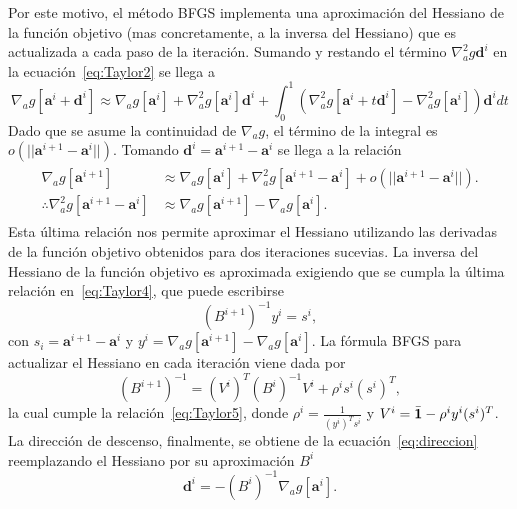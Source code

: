Por este motivo, el método BFGS implementa una aproximación del Hessiano de la función objetivo (mas concretamente, 
a la inversa del Hessiano) que 
es actualizada a cada paso de la iteración. Sumando y restando el término $ \nabla_a^2 g \mathbf{d}^i$ en la ecuación~\eqref{eq:Taylor2} se llega a
\begin{equation}
\nabla_a g[\mathbf{a}^i+ \mathbf{d}^i]\approx \nabla_a g[\mathbf{a}^i]+ \nabla_a^2 g[\mathbf{a}^i]\mathbf{d}^i + \int_0^1   \left( \nabla_a^2 g[\mathbf{a}^i+t\mathbf{d}^i]-\nabla_a^2 g[\mathbf{a}^i] \right)\mathbf{d}^idt
\label{eq:Taylor3}
\end{equation}
Dado que se asume la continuidad de $\nabla_a g$, el término de la integral 
es $o(||\mathbf{a}^{i+1}-\mathbf{a}^{i}||)$. Tomando $\mathbf{d}^i=\mathbf{a}^{i+1}-\mathbf{a}^{i}$ se llega a la relación
\begin{equation}
\begin{split}
\begin{aligned}
\nabla_a g[\mathbf{a}^{i+1}] &\approx \nabla_a g[\mathbf{a}^i]+ \nabla_a^2 g[\mathbf{a}^{i+1}-\mathbf{a}^i]  + o(||\mathbf{a}^{i+1}-\mathbf{a}^{i}||).\\
\therefore \nabla_a^2 g[\mathbf{a}^{i+1}-\mathbf{a}^i]& \approx \nabla_a g[\mathbf{a}^{i+1}]  - \nabla_a g[\mathbf{a}^{i}].
\end{aligned}
\end{split}
\label{eq:Taylor4}
\end{equation}
Esta última relación nos permite aproximar el Hessiano utilizando las derivadas de 
la función objetivo obtenidos para dos iteraciones sucevias. 
La inversa del Hessiano de la función objetivo es aproximada exigiendo que se cumpla la última relación en~\eqref{eq:Taylor4}, que puede escribirse 
\begin{equation}
(B^{i+1})^{-1}y^i=s^i,
\label{eq:Taylor5}
\end{equation}
con $s_i=  \mathbf{a}^{i+1}-\mathbf{a}^{i}$ y $y^i=\nabla_a g[\mathbf{a}^{i+1}]  - \nabla_a g[\mathbf{a}^{i}]$. La fórmula BFGS para actualizar el Hessiano en cada iteración viene dada por~\cite{Nocedal2006}
\begin{equation}
(B^{i+1})^{-1}=(V^i)^T (B^{i})^{-1}V^i + \rho^i s^i (s^i)^T  ,
\label{eq:HBFGS}
\end{equation}
la cual cumple la relación~\eqref{eq:Taylor5}, donde $\rho^i=\frac{1}{(y^i)^T s^i}$ 
y $V^i=\bar{\mathbf{1}} - \rho^i y^i (s^i)^T$. 
La dirección de descenso, finalmente, se obtiene de la ecuación~\eqref{eq:direccion} reemplazando 
el Hessiano por su aproximación $B^i$
\begin{equation}
\mathbf{d}^{i}=-(B^{i})^{-1} \nabla_a g[\mathbf{a}^i]. 
\label{eq:HBFGS2}
\end{equation}

